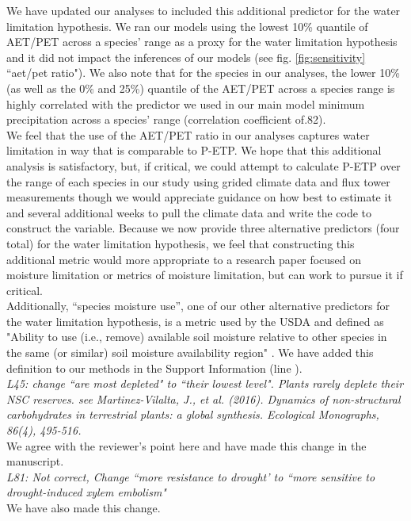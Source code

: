 \documentclass{article}[11pt]
\begin{document}
We have updated our analyses to included this additional predictor for the water limitation hypothesis. We ran our models using the lowest 10\% quantile of AET/PET across a species' range as a proxy for the water limitation hypothesis and it did not impact the inferences of our models (see fig. \ref{fig:sensitivity} ``aet/pet ratio"). We also note that for the species in our analyses, the lower 10\% (as well as the 0\% and 25\%) quantile of the AET/PET across a species range is highly correlated with the predictor we used in our main model minimum precipitation across a species' range (correlation coefficient of.82).\\

We feel that the use of the AET/PET ratio in our analyses captures water limitation in way that is comparable to P-ETP. We hope that this additional analysis is satisfactory, but, if critical, we could attempt to calculate P-ETP over the range of each species in our study using grided climate data and flux tower measurements though we would appreciate guidance on how best to estimate it and several additional weeks to pull the climate data and write the code to construct the variable. Because we now provide three alternative predictors  (four total) for the water limitation hypothesis, we feel that constructing this additional metric would  more appropriate to a research paper focused on moisture limitation or metrics of moisture limitation, but can work to pursue it if critical.\\

Additionally, ``species moisture use'', one of our other alternative predictors for the water limitation hypothesis, is a metric used by the USDA and defined as "Ability to use (i.e., remove) available soil moisture relative to other species in the same (or similar) soil moisture availability region" \citep{usdancrs}. We have added this definition to our methods in the Support Information (line ).\\

\textit{L45: change ``are most depleted" to ``their lowest level". Plants rarely deplete their NSC reserves. see Martinez-Vilalta, J., et al. (2016). Dynamics of non-structural carbohydrates in terrestrial plants: a global synthesis. Ecological Monographs, 86(4), 495-516.}\\

We agree with the reviewer's point here and have made this change in the manuscript.\\


\textit{L81: Not correct, Change ``more resistance to drought' to ``more sensitive to drought-induced xylem embolism"}\\

We have also made this change.


\end{document}
